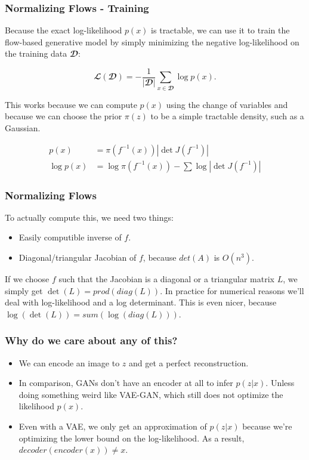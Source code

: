 \documentclass{beamer}
\begin{document}
\begin{frame}
  \frametitle{Normalizing Flows - Training}

  Because the exact log-likelihood $p(x)$ is tractable, we can use it to train
  the flow-based generative model by simply minimizing the negative log-likelihood
  on the training data $𝓓$:

  \[
    𝓛(𝓓) = -\frac{1}{|𝓓|} \sum_{x ∈ 𝓓} \log p(x).
  \]

  This works because we can compute $p(x)$ using the change of variables and
  because we can choose the prior $π(z)$ to be a simple tractable density, such
  as a Gaussian.

  \begin{align}
         p(x) &= π(f^{-1}(x)) |\det J(f^{-1})| \\
    \log p(x) &= \log π(f^{-1}(x)) - \sum \log |\det J(f^{-1})|
  \end{align}

\end{frame}


\begin{frame}
  \frametitle{Normalizing Flows}

  To actually compute this, we need two things:

  \begin{itemize}
    \item Easily computible inverse of $f$.
    \item Diagonal/triangular Jacobian of $f$, because $det(A)$ is $O(n^3)$.
  \end{itemize}

  If we choose $f$ such that the Jacobian is a diagonal or a triangular matrix
  $L$, we simply get $\det(L) = prod(diag(L))$.  In practice for numerical
  reasons we'll deal with log-likelihood and a log determinant.  This is even
  nicer, because $\log(\det(L)) = sum(\log(diag(L)))$.

\end{frame}


\begin{frame}
  \frametitle{Why do we care about any of this?}

  \begin{itemize}
    \item We can encode an image to $z$ and get a perfect reconstruction.

    \item In comparison, GANs don't have an encoder at all to infer $p(z | x)$.
      Unless doing something weird like VAE-GAN, which still does not optimize
      the likelihood $p(x)$.

    \item Even with a VAE, we only get an approximation of $p(z | x)$ because we're optimizing
      the lower bound on the log-likelihood. As a result, $decoder(encoder(x)) \neq x$.
  \end{itemize}
\end{frame}
\end{document}
